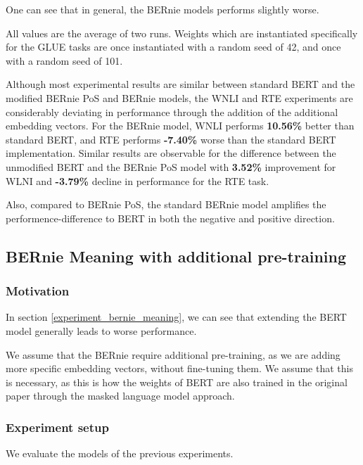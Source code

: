 \documentclass[a4paper,12pt,twoside,openright]{report}
\begin{document}
One can see that in general, the BERnie models performs slightly worse.


All values are the average of two runs. 
Weights which are instantiated specifically for the GLUE tasks are once instantiated with a random seed of 42, and once with a random seed of 101.

Although most experimental results are similar between standard BERT and the modified BERnie PoS and BERnie models, the WNLI and RTE experiments are considerably deviating in performance through the addition of the additional embedding vectors.
For the BERnie model, WNLI performs \textbf{10.56\%} better than standard BERT, and RTE performs  \textbf{-7.40\%} worse than the standard BERT implementation.
Similar results are observable for the difference between the unmodified BERT and the BERnie PoS model with \textbf{3.52\%} improvement for WLNI and \textbf{-3.79\%} decline in performance for the RTE task.

Also, compared to BERnie PoS, the standard BERnie model amplifies the performence-difference to BERT in both the negative and positive direction.


\subsection{BERnie Meaning with additional pre-training}

\subsubsection{Motivation}
In section \ref{experiment_bernie_meaning}, we can see that extending the BERT model generally leads to worse performance.

We assume that the BERnie require additional pre-training, as we are adding more specific embedding vectors, without fine-tuning them.
We assume that this is necessary, as this is how the weights of BERT are also trained in the original paper \cite{devlin18} through the masked language model approach.

\subsubsection{Experiment setup}

We evaluate the models of the previous experiments.
\end{document}
